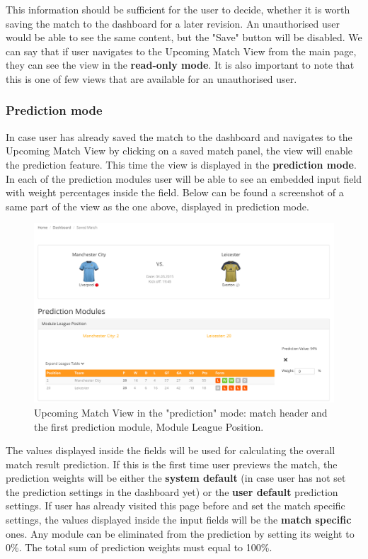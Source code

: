 This information should be sufficient for the user to decide, whether it is worth saving the match to the dashboard for a later revision. An unauthorised user would be able to see the same content, but the "Save" button will be disabled. We can say that if user navigates to the Upcoming Match View from the main page, they can see the view in the \textbf{read-only mode}. It is also important to note that this is one of few views that are available for an unauthorised user.

\subsubsection*{Prediction mode}
\label{subsubsec:predictionmode_implementation}
In case user has already saved the match to the dashboard and navigates to the Upcoming Match View by clicking on a saved match panel, the view will enable the prediction feature. This time the view is displayed in the \textbf{prediction mode}. In each of the prediction modules user will be able to see an embedded input field with weight percentages inside the field. Below can be found a screenshot of a same part of the view as the one above, displayed in prediction mode.

\begin{figure}[H]
	\begin{center}
		\includegraphics[width=.90\textwidth]{impl/images/upcomingMatchViewSM}
		\caption{Upcoming Match View in the "prediction" mode: match header and the first prediction module, Module League Position.} 	  \label{fig:using:upcominmatchviewSM}
	\end{center}
\end{figure}

The values displayed inside the fields will be used for calculating the overall match result prediction. If this is the first time user previews the match, the prediction weights will be either the \textbf{system default} (in case user has not set the prediction settings in the dashboard yet) or the \textbf{user default} prediction settings. If user has already visited this page before and set the match specific settings, the values displayed inside the input fields will be the \textbf{match specific} ones. Any module can be eliminated from the prediction by setting its weight to 0\%. The total sum of prediction weights must equal to 100\%.


